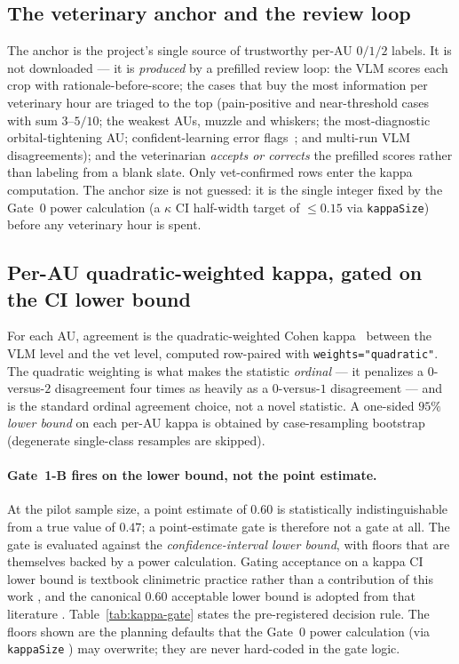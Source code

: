 \subsection{The veterinary anchor and the review loop}
\label{sec:vet-anchor}

The anchor is the project's single source of trustworthy per-AU $0/1/2$ labels.
It is not downloaded --- it is \emph{produced} by a prefilled review loop: the
VLM scores each crop with rationale-before-score; the cases that buy the most
information per veterinary hour are triaged to the top (pain-positive and
near-threshold cases with sum $3$--$5/10$; the weakest AUs, muzzle and whiskers;
the most-diagnostic orbital-tightening AU; confident-learning
error flags~\cite{cleanlab2021}; and multi-run VLM disagreements); and the
veterinarian \emph{accepts or corrects} the prefilled scores rather than
labeling from a blank slate. Only vet-confirmed rows enter the kappa
computation. The anchor size is not guessed: it is the single integer fixed by
the Gate~0 power calculation (a $\kappa$ CI half-width target of $\leq 0.15$ via
\texttt{kappaSize}) before any veterinary hour is spent.

\subsection{Per-AU quadratic-weighted kappa, gated on the CI lower bound}
\label{sec:kappa-gate}

For each AU, agreement is the quadratic-weighted Cohen kappa~\cite{cohen1968kappa}
between the VLM level and the vet level, computed row-paired with
\texttt{weights="quadratic"}. The quadratic weighting is what makes the statistic
\emph{ordinal} --- it penalizes a $0$-versus-$2$ disagreement four times as
heavily as a $0$-versus-$1$ disagreement --- and is the standard ordinal
agreement choice, not a novel statistic. A one-sided
$95\%$ \emph{lower bound} on each per-AU kappa is obtained by case-resampling
bootstrap (degenerate single-class resamples are skipped).

\paragraph{Gate~1-B fires on the lower bound, not the point estimate.} At the
pilot sample size, a point estimate of $0.60$ is statistically
indistinguishable from a true value of $0.47$; a point-estimate gate is
therefore not a gate at all. The gate is evaluated against the
\emph{confidence-interval lower bound}, with floors that are themselves backed
by a power calculation. Gating acceptance on a kappa CI lower bound is textbook
clinimetric practice rather than a contribution of this work
\cite{tractenberg2010kappa,donner2010kappa,rotondi2012kappa,rotondi2018kappasize,simwright2005kappa},
and the canonical $0.60$ acceptable lower bound is adopted from that literature
\cite{simwright2005kappa}. Table~\ref{tab:kappa-gate} states the pre-registered
decision rule. The floors shown are the planning defaults that the Gate~0 power
calculation (via \texttt{kappaSize} \cite{rotondi2018kappasize}) may overwrite;
they are never hard-coded in the gate logic.

